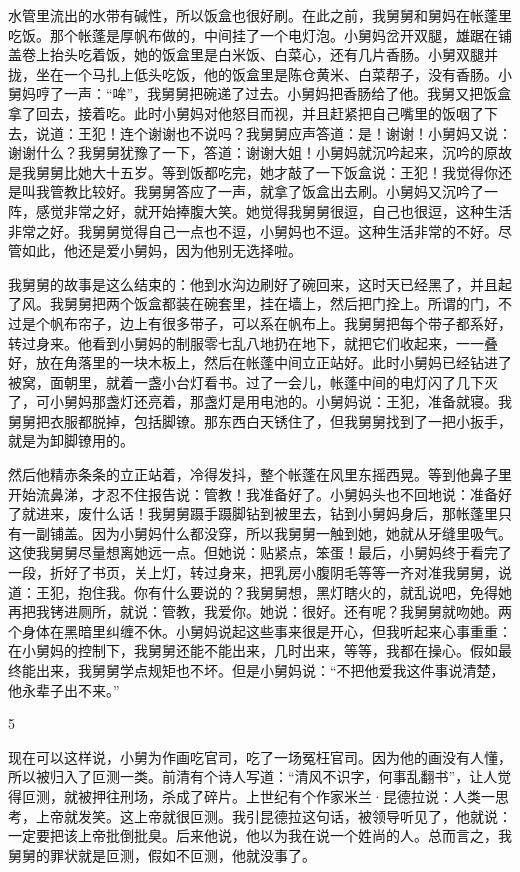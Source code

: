 水管里流出的水带有碱性，所以饭盒也很好刷。在此之前，我舅舅和舅妈在帐蓬里吃饭。那个帐蓬是厚帆布做的，中间挂了一个电灯泡。小舅妈岔开双腿，雄踞在铺盖卷上抬头吃着饭，她的饭盒里是白米饭、白菜心，还有几片香肠。小舅双腿并拢，坐在一个马扎上低头吃饭，他的饭盒里是陈仓黄米、白菜帮子，没有香肠。小舅妈哼了一声：“哞”，我舅舅把碗递了过去。小舅妈把香肠给了他。我舅又把饭盒拿了回去，接着吃。此时小舅妈对他怒目而视，并且赶紧把自己嘴里的饭咽了下去，说道：王犯！连个谢谢也不说吗？我舅舅应声答道：是！谢谢！小舅妈又说：谢谢什么？我舅舅犹豫了一下，答道：谢谢大姐！小舅妈就沉吟起来，沉吟的原故是我舅舅比她大十五岁。等到饭都吃完，她才敲了一下饭盒说：王犯！我觉得你还是叫我管教比较好。我舅舅答应了一声，就拿了饭盒出去刷。小舅妈又沉吟了一阵，感觉非常之好，就开始捧腹大笑。她觉得我舅舅很逗，自己也很逗，这种生活非常之好。我舅舅觉得自己一点也不逗，小舅妈也不逗。这种生活非常的不好。尽管如此，他还是爱小舅妈，因为他别无选择啦。 

我舅舅的故事是这么结束的：他到水沟边刷好了碗回来，这时天已经黑了，并且起了风。我舅舅把两个饭盒都装在碗套里，挂在墙上，然后把门拴上。所谓的门，不过是个帆布帘子，边上有很多带子，可以系在帆布上。我舅舅把每个带子都系好，转过身来。他看到小舅妈的制服零七乱八地扔在地下，就把它们收起来，一一叠好，放在角落里的一块木板上，然后在帐蓬中间立正站好。此时小舅妈已经钻进了被窝，面朝里，就着一盏小台灯看书。过了一会儿，帐蓬中间的电灯闪了几下灭了，可小舅妈那盏灯还亮着，那盏灯是用电池的。小舅妈说：王犯，准备就寝。我舅舅把衣服都脱掉，包括脚镣。那东西白天锈住了，但我舅舅找到了一把小扳手，就是为卸脚镣用的。 

然后他精赤条条的立正站着，冷得发抖，整个帐蓬在风里东摇西晃。等到他鼻子里开始流鼻涕，才忍不住报告说：管教！我准备好了。小舅妈头也不回地说：准备好了就进来，废什么话！我舅舅蹑手蹑脚钻到被里去，钻到小舅妈身后，那帐蓬里只有一副铺盖。因为小舅妈什么都没穿，所以我舅舅一触到她，她就从牙缝里吸气。这使我舅舅尽量想离她远一点。但她说：贴紧点，笨蛋！最后，小舅妈终于看完了一段，折好了书页，关上灯，转过身来，把乳房小腹阴毛等等一齐对准我舅舅，说道：王犯，抱住我。你有什么要说的？我舅舅想，黑灯瞎火的，就乱说吧，免得她再把我铐进厕所，就说：管教，我爱你。她说：很好。还有呢？我舅舅就吻她。两个身体在黑暗里纠缠不休。小舅妈说起这些事来很是开心，但我听起来心事重重：在小舅妈的控制下，我舅舅还能不能出来，几时出来，等等，我都在操心。假如最终能出来，我舅舅学点规矩也不坏。但是小舅妈说：“不把他爱我这件事说清楚，他永辈子出不来。”

5 

现在可以这样说，小舅为作画吃官司，吃了一场冤枉官司。因为他的画没有人懂，所以被归入了叵测一类。前清有个诗人写道：“清风不识字，何事乱翻书”，让人觉得叵测，就被押往刑场，杀成了碎片。上世纪有个作家米兰·昆德拉说：人类一思考，上帝就发笑。这上帝就很叵测。我引昆德拉这句话，被领导听见了，他就说：一定要把该上帝批倒批臭。后来他说，他以为我在说一个姓尚的人。总而言之，我舅舅的罪状就是叵测，假如不叵测，他就没事了。 

